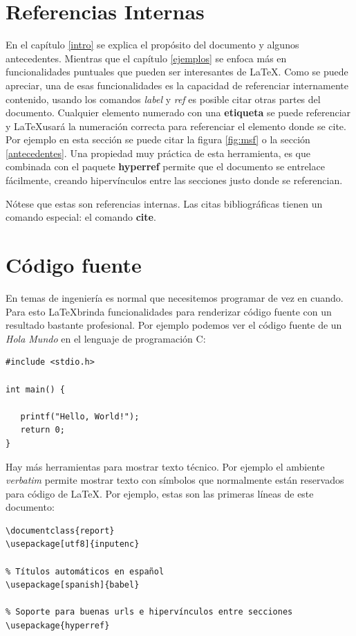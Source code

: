 \documentclass{report}
\begin{document}
\section{Referencias Internas}\label{referencias}
En el capítulo \ref{intro} se explica el propósito del documento y algunos antecedentes. Mientras que el capítulo \ref{ejemplos} se enfoca más en funcionalidades puntuales que pueden ser interesantes de \LaTeX. Como se puede apreciar, una de esas funcionalidades es la capacidad de referenciar internamente contenido, usando los comandos \textit{label} y \textit{ref} es posible citar otras partes del documento. Cualquier elemento numerado con una \textbf{etiqueta} se puede referenciar y \LaTeX usará la numeración correcta para referenciar el elemento donde se cite. Por ejemplo en esta sección se puede citar la figura \ref{fig:msf} o la sección \ref{antecedentes}. Una propiedad muy práctica de esta herramienta, es que combinada con el paquete \textbf{hyperref} permite que el documento se entrelace fácilmente, creando hipervínculos entre las secciones justo donde se referencian.

Nótese que estas son referencias internas. Las citas bibliográficas tienen un comando especial: el comando \textbf{cite}.

\section{Código fuente}
En temas de ingeniería es normal que necesitemos programar de vez en cuando. Para esto \LaTeX brinda funcionalidades para renderizar código fuente con un resultado bastante profesional.
Por ejemplo podemos ver el código fuente de un \textit{Hola Mundo} en el lenguaje de programación C:

\begin{lstlisting}
#include <stdio.h>

int main() {
   
   printf("Hello, World!");
   return 0;
}
\end{lstlisting}

Hay más herramientas para mostrar texto técnico. Por ejemplo el ambiente \textit{verbatim} permite mostrar texto con símbolos que normalmente están reservados para código de \LaTeX. Por ejemplo, estas son las primeras líneas de este documento:

\begin{verbatim}
\documentclass{report}
\usepackage[utf8]{inputenc}

% Títulos automáticos en español
\usepackage[spanish]{babel}

% Soporte para buenas urls e hipervínculos entre secciones
\usepackage{hyperref}
\end{verbatim}
\end{document}

